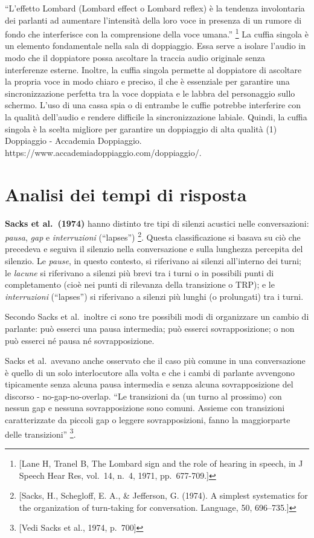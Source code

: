 \documentclass[
]{article}
\begin{document}
``L'effetto Lombard (Lombard effect o Lombard reflex) è la tendenza involontaria dei parlanti ad aumentare l'intensità della loro voce in presenza di un rumore di fondo che interferisce con la comprensione della voce umana.'' \footnote{{[}Lane H, Tranel B, The Lombard sign and the role of hearing in speech, in J Speech Hear Res, vol.~14, n.~4, 1971, pp.~677-709.{]}} La cuffia singola è un elemento fondamentale nella sala di doppiaggio. Essa serve a isolare l'audio in modo che il doppiatore possa ascoltare la traccia audio originale senza interferenze esterne. Inoltre, la cuffia singola permette al doppiatore di ascoltare la propria voce in modo chiaro e preciso, il che è essenziale per garantire una sincronizzazione perfetta tra la voce doppiata e le labbra del personaggio sullo schermo. L'uso di una cassa spia o di entrambe le cuffie potrebbe interferire con la qualità dell'audio e rendere difficile la sincronizzazione labiale. Quindi, la cuffia singola è la scelta migliore per garantire un doppiaggio di alta qualità (1) Doppiaggio - Accademia Doppiaggio. https://www.accademiadoppiaggio.com/doppiaggio/.

\section{Analisi dei tempi di risposta}\label{analisi-dei-tempi-di-risposta}

\textbf{Sacks et al.~(1974)} hanno distinto tre tipi di silenzi acustici nelle conversazioni: \emph{pausa}, \emph{gap} e \emph{interruzioni} (``lapses'') \footnote{{[}Sacks, H., Schegloff, E. A., \& Jefferson, G. (1974). A simplest systematics for the organization of turn-taking for conversation. Language, 50, 696--735.{]}}. Questa classificazione si basava su ciò che precedeva e seguiva il silenzio nella conversazione e sulla lunghezza percepita del silenzio. Le \emph{pause}, in questo contesto, si riferivano ai silenzi all'interno dei turni; le \emph{lacune} si riferivano a silenzi più brevi tra i turni o in possibili punti di completamento (cioè nei punti di rilevanza della transizione o TRP); e le \emph{interruzioni} (``lapses'') si riferivano a silenzi più lunghi (o prolungati) tra i turni.

Secondo Sacks et al.~inoltre ci sono tre possibili modi di organizzare un cambio di parlante: può esserci una pausa intermedia; può esserci sovrapposizione; o non può esserci né pausa né sovrapposizione.

Sacks et al.~avevano anche osservato che il caso più comune in una conversazione è quello di un solo interlocutore alla volta e che i cambi di parlante avvengono tipicamente senza alcuna pausa intermedia e senza alcuna sovrapposizione del discorso - no-gap-no-overlap. ``Le transizioni da (un turno al prossimo) con nessun gap e nessuna sovrapposizione sono comuni. Assieme con transizioni caratterizzate da piccoli gap o leggere sovrapposizioni, fanno la maggiorparte delle transizioni'' \footnote{{[}Vedi Sacks et al., 1974, p.~700{]}}.
\end{document}
